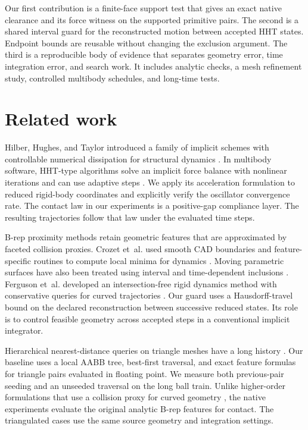 \documentclass[10pt,a4paper]{article}
\begin{document}
Our first contribution is a finite-face support test that gives an exact native clearance and its force witness on the supported primitive pairs. The second is a shared interval guard for the reconstructed motion between accepted HHT states. Endpoint bounds are reusable without changing the exclusion argument. The third is a reproducible body of evidence that separates geometry error, time integration error, and search work. It includes analytic checks, a mesh refinement study, controlled multibody schedules, and long-time tests.

\section{Related work}

Hilber, Hughes, and Taylor introduced a family of implicit schemes with controllable numerical dissipation for structural dynamics \cite{hilber1977}. In multibody software, HHT-type algorithms solve an implicit force balance with nonlinear iterations and can use adaptive steps \cite{chrono}. We apply its acceleration formulation to reduced rigid-body coordinates and explicitly verify the oscillator convergence rate. The contact law in our experiments is a positive-gap compliance layer. The resulting trajectories follow that law under the evaluated time steps.

B-rep proximity methods retain geometric features that are approximated by faceted collision proxies. Crozet et~al. used smooth CAD boundaries and feature-specific routines to compute local minima for dynamics \cite{crozet2018}. Moving parametric surfaces have also been treated using interval and time-dependent inclusions \cite{chen2024}. Ferguson et~al. developed an intersection-free rigid dynamics method with conservative queries for curved trajectories \cite{ferguson2021}. Our guard uses a Hausdorff-travel bound on the declared reconstruction between successive reduced states. Its role is to control feasible geometry across accepted steps in a conventional implicit integrator.

Hierarchical nearest-distance queries on triangle meshes have a long history \cite{larsen2000}. Our baseline uses a local AABB tree, best-first traversal, and exact feature formulas for triangle pairs evaluated in floating point. We measure both previous-pair seeding and an unseeded traversal on the long ball train. Unlike higher-order formulations that use a collision proxy for curved geometry \cite{ferguson2023}, the native experiments evaluate the original analytic B-rep features for contact. The triangulated cases use the same source geometry and integration settings.
\end{document}
